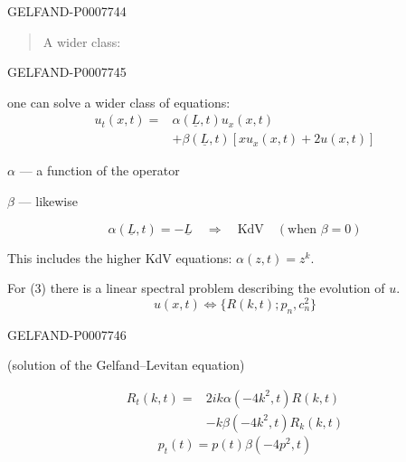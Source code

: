 \begin{GelfandAdjacentEvidence}{GELFAND-P000774}{4}


\begin{quote}
A wider class:
\end{quote}
\end{GelfandAdjacentEvidence}
\begin{GelfandAdjacentEvidence}{GELFAND-P000774}{5}


one can solve a wider class of equations:
\begin{equation}
\begin{split}
u_t(x,t)={}&\alpha(\underline L,t)u_x(x,t)\\
&+\beta(\underline L,t)[xu_x(x,t)+2u(x,t)]
\end{split}\tag{3}
\end{equation}

\(\alpha\) --- a function of the operator

\(\beta\) --- likewise

\[
\alpha(\underline L,t)=-\underline L\quad\Rightarrow\quad
\mathrm{KdV}\quad(\text{when }\beta=0)
\]

This includes the higher KdV equations: \(\alpha(z,t)=z^k\).

For (3) there is a linear spectral problem describing the evolution of \(u\).
\[
u(x,t)\Longleftrightarrow\{R(k,t);p_n,c_n^2\}
\]
\end{GelfandAdjacentEvidence}
\begin{GelfandAdjacentEvidence}{GELFAND-P000774}{6}

(solution of the Gelfand--Levitan equation)

\begin{equation}
\begin{split}
R_t(k,t)={}&2ik\alpha(-4k^2,t)R(k,t)\\
&-k\beta(-4k^2,t)R_k(k,t)
\end{split}\tag{4}
\end{equation}
\begin{equation}
p_t(t)=p(t)\beta(-4p^2,t)\tag{4'}
\end{equation}
\end{GelfandAdjacentEvidence}


